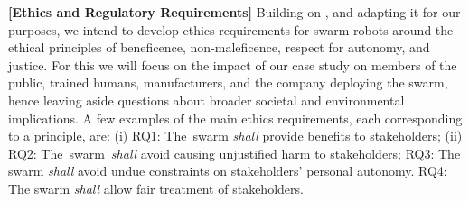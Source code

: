 \documentclass[runningheads]{llncs}
\begin{document}
\noindent \textbf{[Ethics and Regulatory Requirements]}
\newline Building on \cite{Porter2022}, and adapting it for our purposes, we intend to develop ethics requirements for swarm robots around the ethical principles of beneficence, non-maleficence, respect for autonomy, and justice. For this we will focus on the impact of our case study on members of the public, trained humans, manufacturers, and the company deploying the swarm, hence leaving aside questions about broader societal and environmental implications. A few examples of the main ethics requirements, each corresponding to a principle, are: (i) RQ1: The swarm \emph{shall} provide benefits to stakeholders; (ii) RQ2: The swarm \emph{shall} avoid causing unjustified harm to stakeholders; RQ3: The swarm \emph{shall} avoid undue constraints on stakeholders' personal autonomy. RQ4: The swarm \emph{shall} allow fair treatment of stakeholders.  
%
\end{document}
